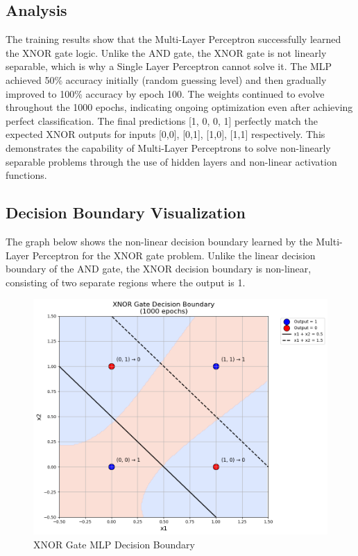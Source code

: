 \documentclass[12pt]{article}
\begin{document}
\subsection*{Analysis}
The training results show that the Multi-Layer Perceptron successfully learned the XNOR gate logic. Unlike the AND gate, the XNOR gate is not linearly separable, which is why a Single Layer Perceptron cannot solve it. The MLP achieved 50\% accuracy initially (random guessing level) and then gradually improved to 100\% accuracy by epoch 100. The weights continued to evolve throughout the 1000 epochs, indicating ongoing optimization even after achieving perfect classification. The final predictions [1, 0, 0, 1] perfectly match the expected XNOR outputs for inputs [0,0], [0,1], [1,0], [1,1] respectively. This demonstrates the capability of Multi-Layer Perceptrons to solve non-linearly separable problems through the use of hidden layers and non-linear activation functions.

\subsection*{Decision Boundary Visualization}
The graph below shows the non-linear decision boundary learned by the Multi-Layer Perceptron for the XNOR gate problem. Unlike the linear decision boundary of the AND gate, the XNOR decision boundary is non-linear, consisting of two separate regions where the output is 1.


\begin{figure}[H]
\centering
\includegraphics[width=1.0\textwidth]{xnor_boundary.png}
\caption{XNOR Gate MLP Decision Boundary}
\end{figure}
\end{document}
